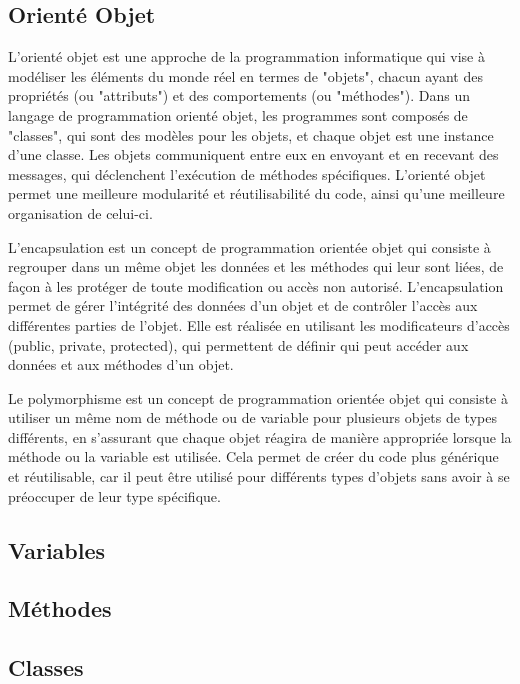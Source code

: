 \subsection{Orienté Objet}
\begin{definition}
L'orienté objet est une approche de la programmation informatique qui vise à modéliser les éléments du monde réel en termes de "objets", chacun ayant des propriétés (ou "attributs") et des comportements (ou "méthodes"). Dans un langage de programmation orienté objet, les programmes sont composés de "classes", qui sont des modèles pour les objets, et chaque objet est une instance d'une classe. Les objets communiquent entre eux en envoyant et en recevant des messages, qui déclenchent l'exécution de méthodes spécifiques. L'orienté objet permet une meilleure modularité et réutilisabilité du code, ainsi qu'une meilleure organisation de celui-ci.
\end{definition}
\begin{definition}[Encapsulation]
L'encapsulation est un concept de programmation orientée objet qui consiste à regrouper dans un même objet les données et les méthodes qui leur sont liées, de façon à les protéger de toute modification ou accès non autorisé. L'encapsulation permet de gérer l'intégrité des données d'un objet et de contrôler l'accès aux différentes parties de l'objet. Elle est réalisée en utilisant les modificateurs d'accès (public, private, protected), qui permettent de définir qui peut accéder aux données et aux méthodes d'un objet.
\end{definition}
\begin{definition}[Polymorphisme]
Le polymorphisme est un concept de programmation orientée objet qui consiste à utiliser un même nom de méthode ou de variable pour plusieurs objets de types différents, en s'assurant que chaque objet réagira de manière appropriée lorsque la méthode ou la variable est utilisée. Cela permet de créer du code plus générique et réutilisable, car il peut être utilisé pour différents types d'objets sans avoir à se préoccuper de leur type spécifique.
\end{definition}
\subsection{Variables}
\subsection{Méthodes}
\subsection{Classes}
